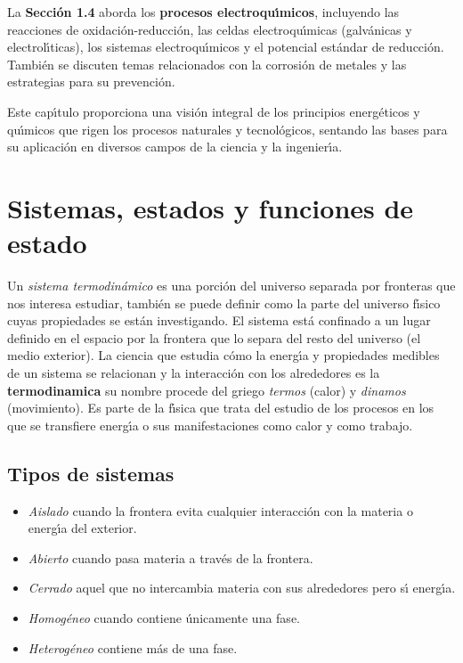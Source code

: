 La \textbf{Secci\'on 1.4} aborda los \textbf{procesos electroqu\'{\i}micos}, incluyendo las reacciones de oxidaci\'on-reducci\'on, las celdas electroqu\'{\i}micas (galv\'anicas y electrol\'{\i}ticas), los sistemas electroqu\'{\i}micos y el potencial est\'andar de reducci\'on. Tambi\'en se discuten temas relacionados con la corrosi\'on de metales y las estrategias para su prevenci\'on.

Este cap\'{\i}tulo proporciona una visi\'on integral de los principios energ\'eticos y qu\'{\i}micos que rigen los procesos naturales y tecnol\'ogicos, sentando las bases para su aplicaci\'on en diversos campos de la ciencia y la ingenier\'{\i}a.

\section{Sistemas, estados y funciones de estado}
 Un \textit{\gls{sistema} termodin\'a\-mi\-co} es una porci\'on del universo separada por fronteras que nos interesa estudiar, tambi\'en se puede definir como la parte del universo f\'{\i}sico cuyas propiedades se est\'an investigando. El sistema est\'a confinado a un lugar definido en el espacio por la \gls{frontera} que lo separa del resto del universo (el medio exterior). La ciencia que estudia c\'omo la energ\'{\i}a y propiedades medibles de un sistema se relacionan y la interacci\'on con los alrededores es la \textbf{\gls{termodinamica}}  su nombre procede del griego \textit{termos} (calor) y \textit{dinamos} (movimiento). Es parte de la f\'{\i}sica que trata del estudio de los procesos en los que se transfiere energ\'{\i}a o sus manifestaciones como calor y como trabajo. 

\subsection{Tipos de sistemas}

\begin{itemize}
\item \textit{Aislado} cuando la frontera evita cualquier interacci\'on con la materia o  energ\'{\i}a del exterior.
\item \textit{Abierto} cuando pasa materia a trav\'es de la frontera.
\item \textit{Cerrado} aquel que no intercambia materia con sus alrededores pero s\'{\i} energ\'{\i}a.
\item \textit{Homog\'eneo} cuando contiene \'unicamente una fase.
\item \textit{Heterog\'eneo} contiene m\'as de una fase.
\end{itemize}

